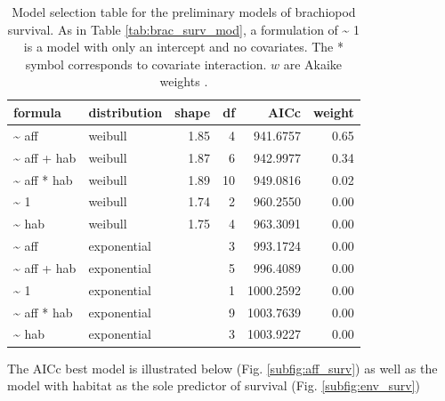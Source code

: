 \documentclass[12pt,letterpaper]{article}
\begin{document}
\begin{table}[ht]
  \centering
  \begin{tabular}{llrrrr}
    \hline
    formula & distribution & shape & df & AICc & weight \\ 
    \hline
    \~{} aff & weibull & 1.85 & 4 & 941.6757 & 0.65 \\ 
    \~{} aff + hab & weibull & 1.87 & 6 & 942.9977 & 0.34 \\ 
    \~{} aff * hab & weibull & 1.89 & 10 & 949.0816 & 0.02 \\ 
    \~{} 1 & weibull & 1.74 & 2 & 960.2550 & 0.00 \\ 
    \~{} hab & weibull & 1.75 & 4 & 963.3091 & 0.00 \\ 
    \~{} aff & exponential &  & 3 & 993.1724 & 0.00 \\ 
    \~{} aff + hab & exponential &  & 5 & 996.4089 & 0.00 \\ 
    \~{} 1 & exponential &  & 1 & 1000.2592 & 0.00 \\ 
    \~{} aff * hab & exponential &  & 9 & 1003.7639 & 0.00 \\ 
    \~{} hab & exponential &  & 3 & 1003.9227 & 0.00 \\ 
    \hline
  \end{tabular}
  \caption[Brachiopod survival models]{Model selection table for the preliminary models of brachiopod survival. As in Table \ref{tab:brac_surv_mod}, a formulation of \~{} 1 is a model with only an intercept and no covariates. The * symbol corresponds to covariate interaction. \(w\) are Akaike weights \citep{Burnham2002a}.}
  \label{tab:bracmod}
\end{table}

The AICc best model is illustrated below (Fig. \ref{subfig:aff_surv}) as well as the model with habitat as the sole predictor of survival (Fig. \ref{subfig:env_surv})
\end{document}
